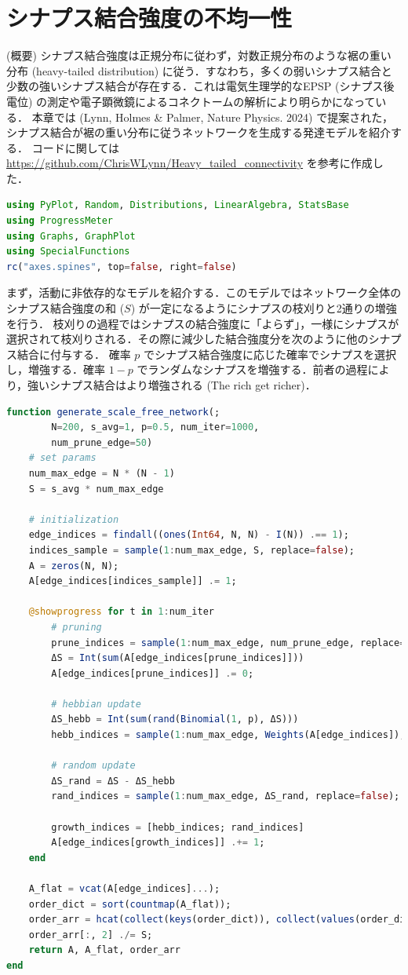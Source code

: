 \section{シナプス結合強度の不均一性}
(概要)
シナプス結合強度は正規分布に従わず，対数正規分布のような裾の重い分布 (heavy-tailed distribution) に従う．すなわち，多くの弱いシナプス結合と少数の強いシナプス結合が存在する．これは電気生理学的なEPSP (シナプス後電位) の測定や電子顕微鏡によるコネクトームの解析により明らかになっている．
本章では (Lynn, Holmes \& Palmer, Nature Physics. 2024) で提案された，シナプス結合が裾の重い分布に従うネットワークを生成する発達モデルを紹介する．
コードに関しては \url{https://github.com/ChrisWLynn/Heavy_tailed_connectivity} を参考に作成した．
\begin{lstlisting}[language=julia]
using PyPlot, Random, Distributions, LinearAlgebra, StatsBase
using ProgressMeter
using Graphs, GraphPlot
using SpecialFunctions
rc("axes.spines", top=false, right=false)
\end{lstlisting}
まず，活動に非依存的なモデルを紹介する．このモデルではネットワーク全体のシナプス結合強度の和 ($S$) が一定になるようにシナプスの枝刈りと2通りの増強を行う．
枝刈りの過程ではシナプスの結合強度に「よらず」，一様にシナプスが選択されて枝刈りされる．その際に減少した結合強度分を次のように他のシナプス結合に付与する．
確率 $p$ でシナプス結合強度に応じた確率でシナプスを選択し，増強する．確率 $1-p$ でランダムなシナプスを増強する．前者の過程により，強いシナプス結合はより増強される (The rich get richer)．
\begin{lstlisting}[language=julia]
function generate_scale_free_network(;
        N=200, s_avg=1, p=0.5, num_iter=1000,
        num_prune_edge=50)
    # set params
    num_max_edge = N * (N - 1)
    S = s_avg * num_max_edge

    # initialization
    edge_indices = findall((ones(Int64, N, N) - I(N)) .== 1);
    indices_sample = sample(1:num_max_edge, S, replace=false);
    A = zeros(N, N);
    A[edge_indices[indices_sample]] .= 1;

    @showprogress for t in 1:num_iter
        # pruning
        prune_indices = sample(1:num_max_edge, num_prune_edge, replace=false)
        ΔS = Int(sum(A[edge_indices[prune_indices]]))
        A[edge_indices[prune_indices]] .= 0;
        
        # hebbian update
        ΔS_hebb = Int(sum(rand(Binomial(1, p), ΔS)))
        hebb_indices = sample(1:num_max_edge, Weights(A[edge_indices]), ΔS_hebb, replace=false)
        
        # random update
        ΔS_rand = ΔS - ΔS_hebb
        rand_indices = sample(1:num_max_edge, ΔS_rand, replace=false);
        
        growth_indices = [hebb_indices; rand_indices]
        A[edge_indices[growth_indices]] .+= 1;
    end

    A_flat = vcat(A[edge_indices]...);
    order_dict = sort(countmap(A_flat));
    order_arr = hcat(collect(keys(order_dict)), collect(values(order_dict)));
    order_arr[:, 2] ./= S;
    return A, A_flat, order_arr
end
\end{lstlisting}

